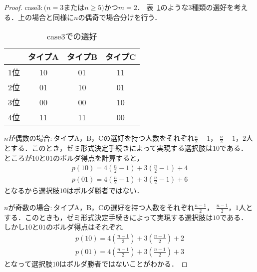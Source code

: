 \documentclass[dvipdfmx]{jsarticle}
\begin{document}
\begin{proof}
  \noindent{}case$3\colon$$(n = 3$または$n \geq 5)$かつ$m = 2$．
  表~\ref{tab:case3}のような$3$種類の選好を考える．上の場合と同様に$n$の偶奇で場合分けを行う．
  \begin{table}[h]
    \caption{case3での選好}\label{tab:case3}
    \begin{center}
      \begin{tabular}{c|c|c|c}\hline
          & タイプA & タイプB & タイプC \\ \hline
        1位 & 10 & 01 & 11 \\
        2位 & 01 & 10 & 01 \\
        3位 & 00 & 00 & 10 \\
        4位 & 11 & 11 & 00 \\ \hline
      \end{tabular}
    \end{center}
  \end{table}

  


\noindent{}$n$が偶数の場合$\colon$タイプA，B，Cの選好を持つ人数をそれぞれ$\frac{n}{2}-1$，
$\frac{n}{2}-1$，$2$人とする．このとき，ゼミ形式決定手続きによって実現する選択肢は$10$である．
ところが$10$と$01$のボルダ得点を計算すると，
\begin{gather*}
  p(10) = 4(\frac{n}{2}-1) + 3(\frac{n}{2}-1) + 4 \\
  p(01) = 4(\frac{n}{2}-1) + 3(\frac{n}{2}-1) + 6
\end{gather*}
となるから選択肢$10$はボルダ勝者ではない．

\noindent{}$n$が奇数の場合$\colon$タイプA，B，Cの選好を持つ人数をそれぞれ$\frac{n-1}{2}$，
  $\frac{n-1}{2}$，$1$人とする．このときも，ゼミ形式決定手続きによって実現する選択肢は$10$である．
  しかし$10$と$01$のボルダ得点はそれぞれ
  \begin{gather*}
    p(10) = 4(\frac{n-1}{2}) + 3(\frac{n-1}{2}) + 2 \\
    p(01) = 4(\frac{n-1}{2}) + 3(\frac{n-1}{2}) + 3
  \end{gather*}
  となって選択肢$10$はボルダ勝者ではないことがわかる．


\end{proof}
\end{document}
